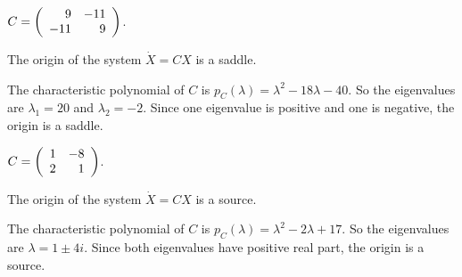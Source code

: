 \documentclass{ximera}
\begin{document}
\begin{exercise} \label{E:sisasoe}
$C=\left(\begin{array}{rr} 9 & -11\\ -11 &9\end{array}\right)$.

\begin{solution}
\ans The origin of the system $\dot{X} = CX$ is a saddle.

\soln The characteristic polynomial of $C$ is
$p_C(\lambda) = \lambda^2 - 18\lambda - 40$.  So the eigenvalues are
$\lambda_1 = 20$ and $\lambda_2 = -2$.  Since one eigenvalue is positive
and one is negative, the origin is a saddle.

\end{solution}
\end{exercise}
\begin{exercise} \label{E:sisasof}
$C=\left(\begin{array}{rr} 1 & -8\\ 2 &1\end{array}\right)$.

\begin{solution}
\ans The origin of the system $\dot{X} = CX$ is a source.

\soln The characteristic polynomial of $C$ is
$p_C(\lambda) = \lambda^2 - 2\lambda + 17$.  So the eigenvalues are
$\lambda = 1 \pm 4i$.  Since both eigenvalues have positive real part,
the origin is a source.

\end{solution}
\end{exercise}

\CEXER
\end{document}
